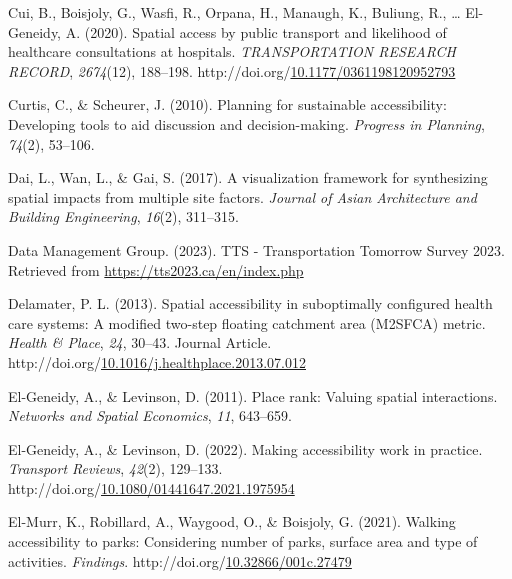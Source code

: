 \documentclass[
11pt, %
oneside, %
english, %
singlespacing, %
]{macthesis} %
\newlength{\cslhangindent}
\newenvironment{CSLReferences}[2] %
{\begin{list}{}{%
	\setlength{\itemindent}{0pt}
	\setlength{\leftmargin}{0pt}
	\setlength{\parsep}{0pt}
	\ifodd #1
	\setlength{\leftmargin}{\cslhangindent}
	\setlength{\itemindent}{-1\cslhangindent}
	\fi
	\setlength{\itemsep}{#2\baselineskip}}}
{\end{list}}
\begin{document}
\begin{CSLReferences}{1}{0}
Cui, B., Boisjoly, G., Wasfi, R., Orpana, H., Manaugh, K., Buliung, R., \ldots{} El-Geneidy, A. (2020). Spatial access by public transport and likelihood of healthcare consultations at hospitals. \emph{{TRANSPORTATION} {RESEARCH} {RECORD}}, \emph{2674}(12), 188--198. http://doi.org/\href{https://doi.org/10.1177/0361198120952793}{10.1177/0361198120952793}

Curtis, C., \& Scheurer, J. (2010). Planning for sustainable accessibility: Developing tools to aid discussion and decision-making. \emph{Progress in Planning}, \emph{74}(2), 53--106.

Dai, L., Wan, L., \& Gai, S. (2017). A visualization framework for synthesizing spatial impacts from multiple site factors. \emph{Journal of Asian Architecture and Building Engineering}, \emph{16}(2), 311--315.

Data Management Group. (2023). {TTS} - {Transportation} {Tomorrow} {Survey} 2023. Retrieved from \url{https://tts2023.ca/en/index.php}

Delamater, P. L. (2013). Spatial accessibility in suboptimally configured health care systems: A modified two-step floating catchment area (M2SFCA) metric. \emph{Health \& Place}, \emph{24}, 30--43. Journal Article. http://doi.org/\href{https://doi.org/10.1016/j.healthplace.2013.07.012}{10.1016/j.healthplace.2013.07.012}

El-Geneidy, A., \& Levinson, D. (2011). Place rank: Valuing spatial interactions. \emph{Networks and Spatial Economics}, \emph{11}, 643--659.

El-Geneidy, A., \& Levinson, D. (2022). Making accessibility work in practice. \emph{Transport Reviews}, \emph{42}(2), 129--133. http://doi.org/\href{https://doi.org/10.1080/01441647.2021.1975954}{10.1080/01441647.2021.1975954}

El-Murr, K., Robillard, A., Waygood, O., \& Boisjoly, G. (2021). Walking accessibility to parks: Considering number of parks, surface area and type of activities. \emph{Findings}. http://doi.org/\href{https://doi.org/10.32866/001c.27479}{10.32866/001c.27479}


\end{CSLReferences}
\end{document}
